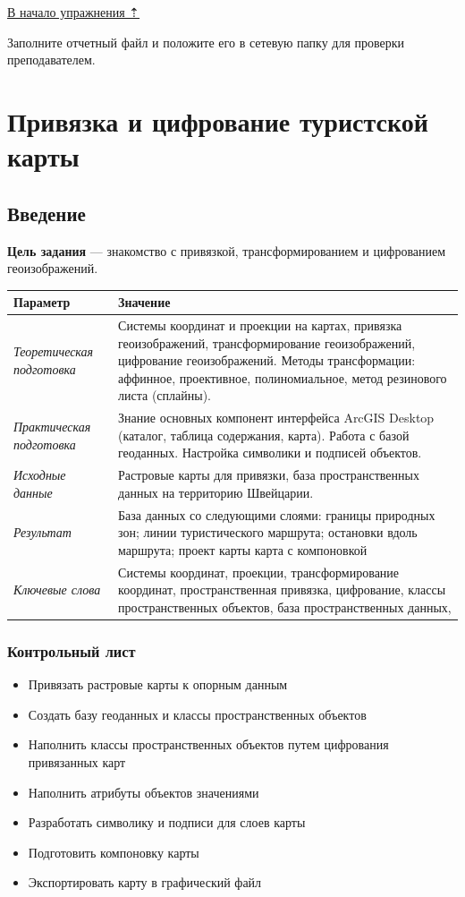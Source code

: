 \documentclass[]{book}
\providecommand{\tightlist}{%
  \setlength{\itemsep}{0pt}\setlength{\parskip}{0pt}}
\theoremstyle{definition}
\theoremstyle{definition}
\theoremstyle{definition}
\theoremstyle{remark}
\begin{document}
\protect\hyperlink{map-ref-economic}{В начало упражнения ⇡}

Заполните отчетный файл и положите его в сетевую папку для проверки
преподавателем.

\hypertarget{map-ref-general}{%
\chapter{Привязка и цифрование туристской карты}\label{map-ref-general}}

\hypertarget{map-ref-general-intro}{%
\section{Введение}\label{map-ref-general-intro}}

\textbf{Цель задания} --- знакомство с привязкой, трансформированием и
цифрованием геоизображений.

\begin{longtable}[]{@{}ll@{}}
\toprule
Параметр & Значение\tabularnewline
\midrule
\endhead
\emph{Теоретическая подготовка} & Системы координат и проекции на
картах, привязка геоизображений, трансформирование геоизображений,
цифрование геоизображений. Методы трансформации: аффинное, проективное,
полиномиальное, метод резинового листа (сплайны).\tabularnewline
\emph{Практическая подготовка} & Знание основных компонент интерфейса
ArcGIS Desktop (каталог, таблица содержания, карта). Работа с базой
геоданных. Настройка символики и подписей объектов.\tabularnewline
\emph{Исходные данные} & Растровые карты для привязки, база
пространственных данных на территорию Швейцарии.\tabularnewline
\emph{Результат} & База данных со следующими слоями: границы природных
зон; линии туристического маршрута; остановки вдоль маршрута; проект
карты карта с компоновкой\tabularnewline
\emph{Ключевые слова} & Системы координат, проекции, трансформирование
координат, пространственная привязка, цифрование, классы
пространственных объектов, база пространственных данных,\tabularnewline
\bottomrule
\end{longtable}

\hypertarget{map-ref-general-control}{%
\subsection{Контрольный лист}\label{map-ref-general-control}}

\begin{itemize}
\tightlist
\item
  Привязать растровые карты к опорным данным
\item
  Создать базу геоданных и классы пространственных объектов
\item
  Наполнить классы пространственных объектов путем цифрования
  привязанных карт
\item
  Наполнить атрибуты объектов значениями
\item
  Разработать символику и подписи для слоев карты
\item
  Подготовить компоновку карты
\item
  Экспортировать карту в графический файл
\end{itemize}
\end{document}
